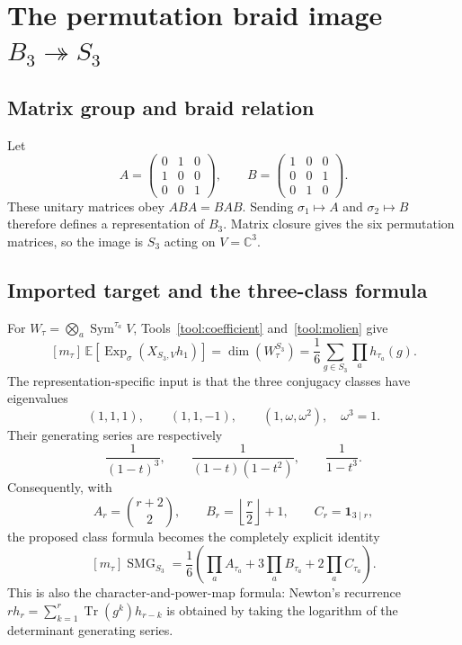\documentclass[10pt]{article}
\newcommand{\ExpS}{\operatorname{Exp}_{\sigma}}
\newcommand{\SMG}{\operatorname{SMG}}
\newcommand{\smgv}[2]{\mathbb E\!\left[\ExpS\!\left(X_{#1,#2}h_1\right)\right]}
\begin{document}
\clearpage
\section[The permutation braid image B3 onto S3]{The permutation braid image $B_3\twoheadrightarrow S_3$}\label{proof:braid-s3}
\begingroup
{}
\providecommand{\Sgm}{\SMG}
\renewcommand{\Sgm}{\SMG}
\setcounter{theorem}{0}
\setcounter{proposition}{0}
\setcounter{lemma}{0}
\setcounter{corollary}{0}
\setcounter{remark}{0}
\begin{abstract}
We construct the adjacent-transposition quotient of $B_3$ in the
three-dimensional permutation representation.  We derive its sigma--MGF
coefficient formula from the three spectral types of $S_3$, and independently
recover the same integers as ranks of explicit Reynolds projectors on tensor
products of symmetric powers.
\end{abstract}

\subsection{Matrix group and braid relation}
Let
\[
 A=\begin{pmatrix}0&1&0\\1&0&0\\0&0&1\end{pmatrix},\qquad
 B=\begin{pmatrix}1&0&0\\0&0&1\\0&1&0\end{pmatrix}.
\]
These unitary matrices obey $ABA=BAB$.  Sending
$\sigma_1\mapsto A$ and $\sigma_2\mapsto B$ therefore defines a
representation of $B_3$.  Matrix closure gives the six permutation matrices,
so the image is $S_3$ acting on $V=\mathbb C^3$.

\subsection{Imported target and the three-class formula}
For $W_\tau=\bigotimes_a\operatorname{Sym}^{\tau_a}V$,
Tools~\ref{tool:coefficient} and~\ref{tool:molien} give
\[
 [m_\tau]\,\smgv{S_3}{V}=\dim(W_\tau^{S_3})
 =\frac16\sum_{g\in S_3}\prod_a h_{\tau_a}(g).
\]
The representation-specific input is that the three conjugacy classes have
eigenvalues
\[
 (1,1,1),\qquad(1,1,-1),\qquad(1,\omega,\omega^2),
 \quad \omega^3=1.
\]
Their generating series are respectively
\[
 \frac1{(1-t)^3},\qquad \frac1{(1-t)(1-t^2)},\qquad\frac1{1-t^3}.
\]
Consequently, with
\[
 A_r=\binom{r+2}{2},\qquad B_r=\left\lfloor\frac r2\right\rfloor+1,
 \qquad C_r=\mathbf1_{3\mid r},
\]
the proposed class formula becomes the completely explicit identity
\[
 \boxed{[m_\tau]\Sgm_{S_3}=\frac16\left(
 \prod_a A_{\tau_a}+3\prod_a B_{\tau_a}+2\prod_a C_{\tau_a}\right).}
\]
This is also the character-and-power-map formula: Newton's recurrence
$r h_r=\sum_{k=1}^r\operatorname{Tr}(g^k)h_{r-k}$ is obtained by taking
the logarithm of the determinant generating series.
\end{document}
